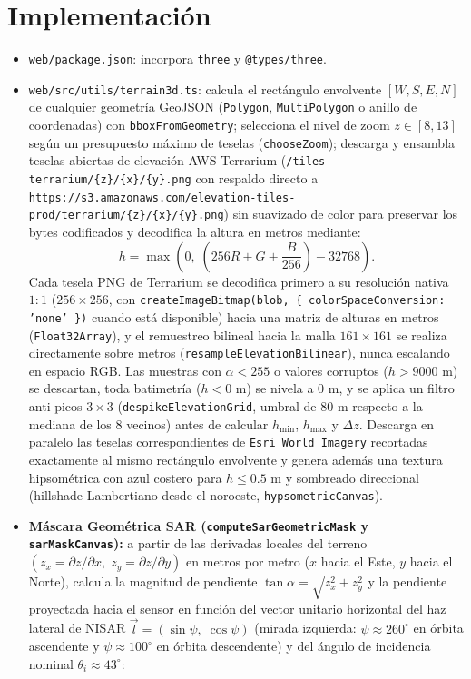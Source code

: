 \documentclass[11pt,a4paper]{article}
\begin{document}
\section{Implementaci\'on}
\begin{itemize}
  \item \texttt{web/package.json}: incorpora \texttt{three} y \texttt{@types/three}.
  \item \texttt{web/src/utils/terrain3d.ts}: calcula el rect\'angulo envolvente $[W, S, E, N]$ de cualquier geometr\'ia GeoJSON (\texttt{Polygon}, \texttt{MultiPolygon} o anillo de coordenadas) con \texttt{bboxFromGeometry}; selecciona el nivel de zoom $z \in [8, 13]$ seg\'un un presupuesto m\'aximo de teselas (\texttt{chooseZoom}); descarga y ensambla teselas abiertas de elevaci\'on AWS Terrarium (\texttt{/tiles-terrarium/\{z\}/\{x\}/\{y\}.png} con respaldo directo a \texttt{https://s3.amazonaws.com/elevation-tiles-prod/terrarium/\{z\}/\{x\}/\{y\}.png}) sin suavizado de color para preservar los bytes codificados y decodifica la altura en metros mediante:
  \begin{equation}
    h = \max\left(0,\; \left(256 R + G + \frac{B}{256}\right) - 32768\right).
  \end{equation}
  Cada tesela PNG de Terrarium se decodifica primero a su resoluci\'on nativa $1:1$ ($256 \times 256$, con \texttt{createImageBitmap(blob, \{ colorSpaceConversion: 'none' \})} cuando est\'a disponible) hacia una matriz de alturas en metros (\texttt{Float32Array}), y el remuestreo bilineal hacia la malla $161 \times 161$ se realiza directamente sobre metros (\texttt{resampleElevationBilinear}), nunca escalando en espacio RGB. Las muestras con $\alpha < 255$ o valores corruptos ($h > 9000\text{ m}$) se descartan, toda batimetr\'ia ($h < 0\text{ m}$) se nivela a $0\text{ m}$, y se aplica un filtro anti-picos $3 \times 3$ (\texttt{despikeElevationGrid}, umbral de $80\text{ m}$ respecto a la mediana de los 8 vecinos) antes de calcular $h_{\min}$, $h_{\max}$ y $\Delta z$. Descarga en paralelo las teselas correspondientes de \texttt{Esri World Imagery} recortadas exactamente al mismo rect\'angulo envolvente y genera adem\'as una textura hipsom\'etrica con azul costero para $h \le 0.5\text{ m}$ y sombreado direccional (hillshade Lambertiano desde el noroeste, \texttt{hypsometricCanvas}).
  \item \textbf{M\'ascara Geom\'etrica SAR (\texttt{computeSarGeometricMask} y \texttt{sarMaskCanvas}):} a partir de las derivadas locales del terreno $(z_x = \partial z/\partial x,\; z_y = \partial z/\partial y)$ en metros por metro ($x$ hacia el Este, $y$ hacia el Norte), calcula la magnitud de pendiente $\tan\alpha = \sqrt{z_x^2 + z_y^2}$ y la pendiente proyectada hacia el sensor en funci\'on del vector unitario horizontal del haz lateral de NISAR $\vec l = (\sin\psi,\; \cos\psi)$ (mirada izquierda: $\psi \approx 260^\circ$ en \'orbita ascendente y $\psi \approx 100^\circ$ en \'orbita descendente) y del \'angulo de incidencia nominal $\theta_i \approx 43^\circ$:

\end{itemize}
\end{document}
